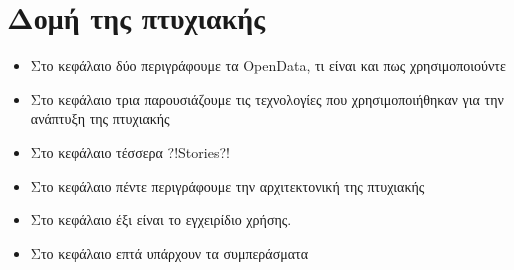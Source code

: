 \section{Δομή της πτυχιακής}
\begin{itemize}
    \item Στο κεφάλαιο δύο περιγράφουμε τα OpenData, τι είναι και πως χρησιμοποιούντε
    \item Στο κεφάλαιο τρια παρουσιάζουμε τις τεχνολογίες που χρησιμοποιήθηκαν για την ανάπτυξη της πτυχιακής
    \item Στο κεφάλαιο τέσσερα ?!Stories?!
    \item Στο κεφάλαιο πέντε περιγράφουμε την αρχιτεκτονική της πτυχιακής
    \item Στο κεφάλαιο έξι είναι το εγχειρίδιο χρήσης.
    \item Στο κεφάλαιο επτά υπάρχουν τα συμπεράσματα
\end{itemize}